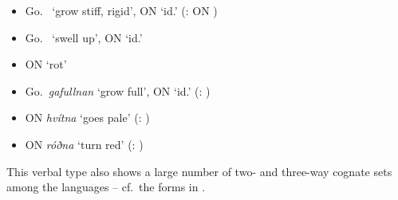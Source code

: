 \documentclass[output=paper,colorlinks,citecolor=brown]{langscibook}
\begin{document}
\begin{exe}
\begin{xlist}
\begin{itemize}
        \item Go.\  ‘grow stiff, rigid', ON  ‘id.’ (: ON )
        \item Go.\  ‘swell up', ON  ‘id.’
        \item ON  ‘rot’
        \item Go.\ \textit{gafullnan} ‘grow full', ON  ‘id.’ (: )
        \item ON \textit{hvítna} ‘goes pale’ (: )
        \item ON \textit{róðna} ‘turn red’ (: )
    \end{itemize}
\end{xlist}
\end{exe}

This  verbal type also shows a large number of two- and three-way cognate sets among the languages -- cf.\ the forms in .
\end{document}
